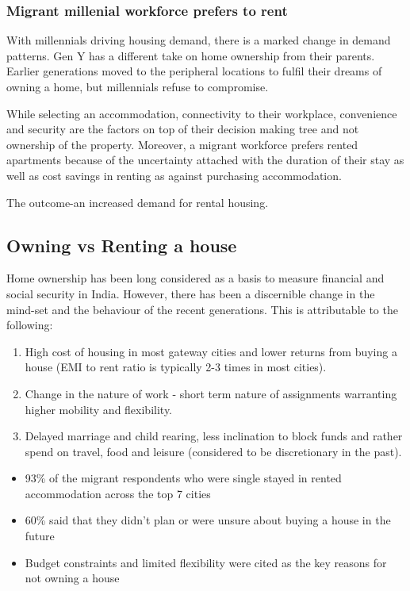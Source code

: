 \subsubsection{Migrant millenial workforce prefers to rent}
With millennials driving housing demand, there is a marked change in demand patterns. Gen Y has a different take on home
ownership from their parents. Earlier generations moved to the peripheral locations to fulfil their dreams of owning a home, but
millennials refuse to compromise.\par\medskip
While selecting an accommodation, connectivity to their workplace, convenience and security are the factors on top of their
decision making tree and not ownership of the property. Moreover, a migrant workforce prefers rented apartments because of the
uncertainty attached with the duration of their stay as well as cost savings in renting as against purchasing accommodation.\par\medskip
The outcome-an increased demand for rental housing.

\subsection{Owning vs Renting a house}
\noindent Home ownership has been long considered as a basis to measure financial and social security in India.
However, there has been a discernible change in the mind-set and the behaviour of the recent generations. This is attributable to the following:\par

\begin{enumerate}
      \item High cost of housing in most gateway cities and lower returns from buying a house (EMI to rent ratio is typically 2-3 times in
            most cities).
      \item Change in the nature of work - short term nature of assignments warranting higher mobility and flexibility.
      \item Delayed marriage and child rearing, less inclination to block funds and rather spend on travel, food and leisure (considered to
            be discretionary in the past).
\end{enumerate}

\begin{itemize}
      \item 93\% of the migrant respondents who were single stayed in rented accommodation across the top 7 cities
      \item 60\% said that they didn’t plan or were unsure about buying a house in the future
      \item Budget constraints and limited flexibility were cited as the key reasons for not owning a house
\end{itemize}

